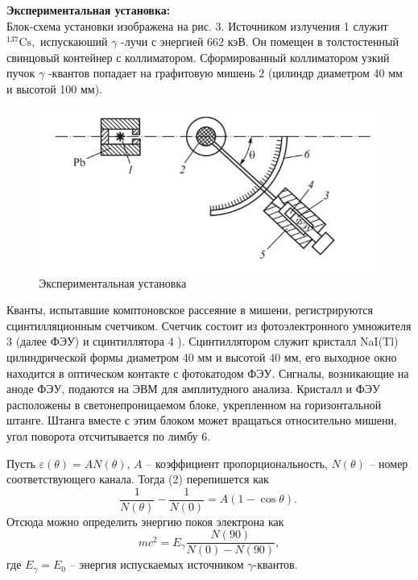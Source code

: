 \documentclass[a4paper, 12pt]{article}%
\begin{document}
	
	\textbf{Экспериментальная установка: }\\
	Блок-схема установки изображена на рис. $3 .$ Источником излучения 1 служит $^{137} \mathrm{Cs},$ испускаюший $\gamma$ -лучи с энергией 662 кэВ. Он помещен в толстостенный свинцовый контейнер с коллиматором. Сформированный коллиматором узкий пучок $\gamma$ -квантов попадает на графитовую мишень 2 (цилиндр диаметром 40 мм и высотой 100 мм).
	
	\begin{figure}[h]
		\begin{center}
			\includegraphics[width = \textwidth]{16.jpg}
			\caption{Экспериментальная установка}
		\end{center}
	\end{figure}
	
	Кванты, испытавшие комптоновское рассеяние в мишени, регистрируются сцинтилляционным счетчиком. Счетчик состоит из фотоэлектронного умножителя 3 (далее ФЭУ) и сцинтиллятора $4$ ). Сцинтиллятором служит кристалл NaI(Tl) цилиндрической формы диаметром 40 мм и высотой 40 мм, его выходное окно находится в оптическом контакте с фотокатодом ФЭУ. Сигналы, возникающие на аноде ФЭУ, подаются на ЭВМ для амплитудного анализа. Кристалл и ФЭУ расположены в светонепроницаемом блоке, укрепленном на горизонтальной штанге. Штанга вместе с этим блоком может вращаться относительно мишени, угол поворота отсчитывается по лимбу $6 .$
	
	Пусть $\varepsilon(\theta) = AN(\theta)$, $A$ -- коэффициент пропорциональность, $N(\theta)$ -- номер соответствующего канала. Тогда (2) перепишется как
	\begin{equation}
		\dfrac{1}{N(\theta)} - \dfrac{1}{N(0)} = A(1-\cos \theta).\
	\end{equation}
	Отсюда можно определить энергию покоя электрона как 
	\begin{equation}
		mc^2 = E_\gamma \dfrac{N(90)}{N(0) - N(90)},
	\end{equation}
	где $E_\gamma = E_0$ -- энергия испускаемых источником $\gamma$-квантов.
	
\end{document}
